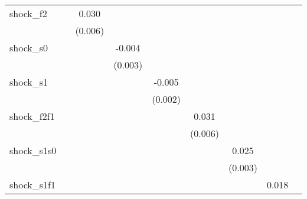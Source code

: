 {\begin{tabular}{l*{8}{c}}
\addlinespace
shock\_f2    &                     &       0.030\sym{***}&                     &                     &                     &                     &                     &                     \\
            &                     &     (0.006)         &                     &                     &                     &                     &                     &                     \\
\addlinespace
shock\_s0    &                     &                     &      -0.004         &                     &                     &                     &                     &                     \\
            &                     &                     &     (0.003)         &                     &                     &                     &                     &                     \\
\addlinespace
shock\_s1    &                     &                     &                     &      -0.005\sym{***}&                     &                     &                     &                     \\
            &                     &                     &                     &     (0.002)         &                     &                     &                     &                     \\
\addlinespace
shock\_f2f1  &                     &                     &                     &                     &       0.031\sym{***}&                     &                     &                     \\
            &                     &                     &                     &                     &     (0.006)         &                     &                     &                     \\
\addlinespace
shock\_s1s0  &                     &                     &                     &                     &                     &       0.025\sym{***}&                     &                     \\
            &                     &                     &                     &                     &                     &     (0.003)         &                     &                     \\
\addlinespace
shock\_s1f1  &                     &                     &                     &                     &                     &                     &       0.018\sym{***}&                     \\

\end{tabular}}
